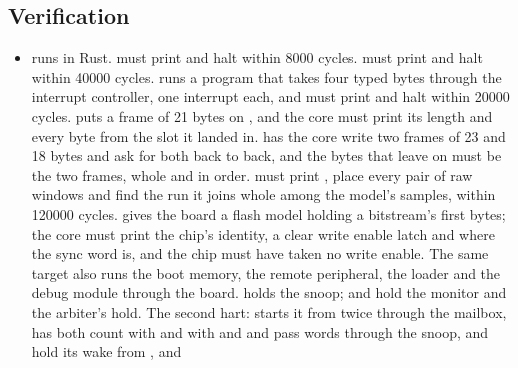 \subsection*{Verification}

\begin{itemize}
\item {} runs  in
Rust.  must print
 and halt within 8000 cycles.
 must print
 and halt within 40000 cycles.
 runs a program
that takes four typed bytes through the interrupt controller, one
interrupt each, and must print  and
halt within 20000 cycles.
puts a frame of 21 bytes on , and the core must print its
length and every byte from the slot it landed in.
has the core write two frames of 23 and 18 bytes and ask for both back
to back, and the bytes that leave on  must be the two
frames, whole and in order.
 must print
, place every pair of raw windows and find the run it
joins whole among the model's samples, within 120000 cycles.
 gives the
board a flash model holding a bitstream's first bytes; the core must
print the chip's identity, a clear write enable latch and where the
sync word is, and the chip must have taken no write enable.
The same target also runs the boot memory, the remote peripheral, the
loader and the debug module through the board.
\allowbreak
{} holds the snoop;
\allowbreak
{} and
\allowbreak
{} hold the
monitor and the arbiter's hold. The second hart:
\allowbreak
{} starts it from
 twice through the mailbox, 
has both count with  and with  and
 and pass words through the snoop,
\allowbreak{} and
\allowbreak
{} hold its wake
from , and \allowbreak

\end{itemize}
